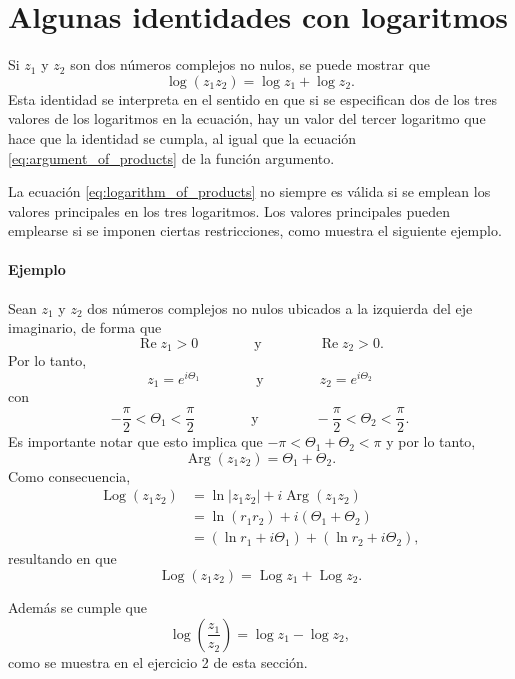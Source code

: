 \documentclass[a4paper]{report}
\renewcommand{\Re}{\operatorname{Re}}
\DeclareMathOperator{\Arg}{Arg}
\DeclareMathOperator{\Log}{Log}
\begin{document}
\section{Algunas identidades con logaritmos}\label{sec:logarithm_identities}

Si \(z_1\) y \(z_2\) son dos números complejos no nulos, se puede mostrar que 
\begin{equation}\label{eq:logarithm_of_products}
 \log(z_1z_2)=\log z_1+\log z_2. 
\end{equation}
Esta identidad se interpreta en el sentido en que si se especifican dos de los tres valores de los logaritmos en la ecuación, hay un valor del tercer logaritmo que hace que la identidad se cumpla, al igual que la ecuación \ref{eq:argument_of_products} de la función argumento.

La ecuación \ref{eq:logarithm_of_products} no siempre es válida si se emplean los valores principales en los tres logaritmos. Los valores principales pueden emplearse si se imponen ciertas restricciones, como muestra el siguiente ejemplo.

\paragraph{Ejemplo} Sean \(z_1\) y \(z_2\) dos números complejos no nulos ubicados a la izquierda del eje imaginario, de forma que
\[
 \Re z_1>0
 \qquad\qquad\textrm{y}\qquad\qquad
 \Re z_2>0.
\]
Por lo tanto,
\[
 z_1=e^{i\Theta_1}
 \qquad\qquad\textrm{y}\qquad\qquad
 z_2=e^{i\Theta_2}
\]
con 
\[
 -\frac{\pi}{2}<\Theta_1<\frac{\pi}{2}
 \qquad\qquad\textrm{y}\qquad\qquad
 -\frac{\pi}{2}<\Theta_2<\frac{\pi}{2}.
\]
Es importante notar que esto implica que \(-\pi<\Theta_1+\Theta_2<\pi\) y por lo tanto,
\[
 \Arg(z_1z_2)=\Theta_1+\Theta_2.
\]
Como consecuencia,
\begin{align*}
 \Log(z_1z_2)&=\ln|z_1z_2|+i\Arg(z_1z_2)\\
  &=\ln(r_1r_2)+i(\Theta_1+\Theta_2)\\
  &=(\ln r_1+i\Theta_1)+(\ln r_2+i\Theta_2),
\end{align*}
resultando en que 
\[
 \Log(z_1z_2)=\Log z_1+\Log z_2.
\]

Además se cumple que 
\begin{equation}\label{eq:logarithm_of_quotient}
 \log\left(\frac{z_1}{z_2}\right)=\log z_1-\log z_2,
\end{equation}
como se muestra en el ejercicio 2 de esta sección.
\end{document}
